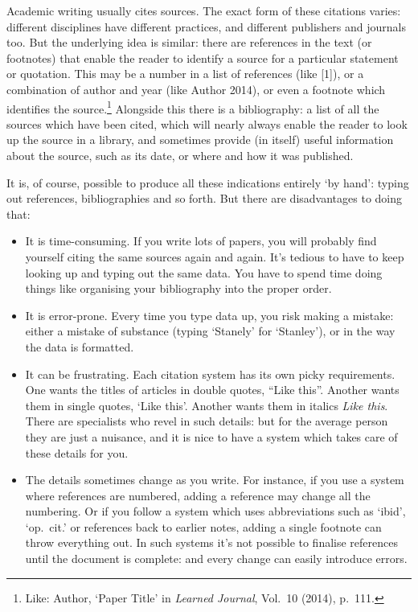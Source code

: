 Academic writing usually cites sources.
The exact form of these
citations varies: different disciplines have different practices, and
different publishers and journals too. But the underlying idea is
similar: there are references in the text (or footnotes) that enable
the reader to identify a source for a particular statement or
quotation. This may be a number in a list of references (like [1]),
or a combination of author and year (like Author 2014), or even a
footnote which identifies the source.\footnote{Like: Author, `Paper
  Title' in \emph{Learned Journal}, Vol.\ 10 (2014), p.\ 111.}
Alongside this there is a bibliography: a list of all the sources
which have been cited, which will nearly always enable the reader to
look up the source in a library, and sometimes provide (in itself)
useful information about the source, such as its date, or where
and how it was published.

It is, of course, possible to produce all these indications entirely
`by hand': typing out references, bibliographies and so forth. But
there are disadvantages to doing that:
\begin{itemize}
\item It is time-consuming. If you write lots of papers, you will
  probably find yourself citing the same sources again and again. It's
  tedious to have to keep looking up and typing out the same data. You
  have to spend time doing things like organising your bibliography
  into the proper order.
\item It is error-prone. Every time you type data up, you risk making
  a mistake: either a mistake of substance (typing `Stanely' for
  `Stanley'), or in the way the data is formatted.
\item It can be frustrating. Each citation system has its own picky
  requirements. One wants the titles of articles in double quotes,
  ``Like this''. Another wants them in single quotes, `Like
  this'. Another wants them in italics \emph{Like this}. There are
  specialists who revel in such details: but for the average person
  they are just a nuisance, and it is nice to have a system which
  takes care of these details for you.
\item The details sometimes change as you write. For instance, if you
  use a system where references are numbered, adding a reference may
  change all the numbering. Or if you follow a system which uses
  abbreviations such as `ibid', `op.\ cit.' or references back to
  earlier notes, adding a single footnote can throw everything out. In
  such systems it's not possible to finalise references until the
  document is complete: and every change can easily introduce errors.
\end{itemize}

